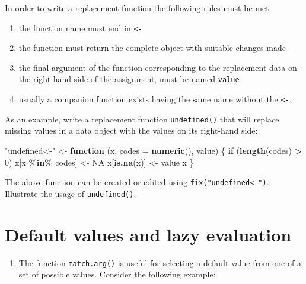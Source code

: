 \documentclass[
]{book}
\newenvironment{Shaded}{\begin{snugshade}}{\end{snugshade}}
\newcommand{\AttributeTok}[1]{\textcolor[rgb]{0.13,0.29,0.53}{#1}}
\newcommand{\ConstantTok}[1]{\textcolor[rgb]{0.56,0.35,0.01}{#1}}
\newcommand{\ControlFlowTok}[1]{\textcolor[rgb]{0.13,0.29,0.53}{\textbf{#1}}}
\newcommand{\DecValTok}[1]{\textcolor[rgb]{0.00,0.00,0.81}{#1}}
\newcommand{\FunctionTok}[1]{\textcolor[rgb]{0.13,0.29,0.53}{\textbf{#1}}}
\newcommand{\NormalTok}[1]{#1}
\newcommand{\OtherTok}[1]{\textcolor[rgb]{0.56,0.35,0.01}{#1}}
\newcommand{\SpecialCharTok}[1]{\textcolor[rgb]{0.81,0.36,0.00}{\textbf{#1}}}
\newcommand{\StringTok}[1]{\textcolor[rgb]{0.31,0.60,0.02}{#1}}
\providecommand{\tightlist}{%
  \setlength{\itemsep}{0pt}\setlength{\parskip}{0pt}}
\begin{document}
In order to write a replacement function the following rules must be met:

\begin{enumerate}
\def\labelenumi{(\roman{enumi})}
\item
  the function name must end in \texttt{\textless{}-}
\item
  the function must return the complete object with suitable changes made
\item
  the final argument of the function corresponding to the replacement data on the right-hand side of the assignment, must be named \texttt{value}
\item
  usually a companion function exists having the same name without the \texttt{\textless{}-}.
\end{enumerate}

As an example, write a replacement function \texttt{undefined()} that will replace missing values in a data object with the values on its right-hand side:

\begin{Shaded}
\begin{Highlighting}[]
\StringTok{"undefined\textless{}{-}"} \OtherTok{\textless{}{-}} \ControlFlowTok{function}\NormalTok{ (x, }\AttributeTok{codes =} \FunctionTok{numeric}\NormalTok{(), value) }
\NormalTok{  \{ }\ControlFlowTok{if}\NormalTok{ (}\FunctionTok{length}\NormalTok{(codes) }\SpecialCharTok{\textgreater{}} \DecValTok{0}\NormalTok{) x[x }\SpecialCharTok{\%in\%}\NormalTok{ codes] }\OtherTok{\textless{}{-}} \ConstantTok{NA}
\NormalTok{    x[}\FunctionTok{is.na}\NormalTok{(x)] }\OtherTok{\textless{}{-}}\NormalTok{ value}
\NormalTok{    x}
\NormalTok{  \}}
\end{Highlighting}
\end{Shaded}

The above function can be created or edited using \texttt{fix("undefined\textless{}-")}. Illustrate the usage of \texttt{undefined()}.

\section{Default values and lazy evaluation}\label{default-values-and-lazy-evaluation}

\begin{enumerate}
\def\labelenumi{(\alph{enumi})}
\tightlist
\item
  The function \texttt{match.arg()} is useful for selecting a default value from one of a set of possible values. Consider the following example:
\end{enumerate}
\end{document}
